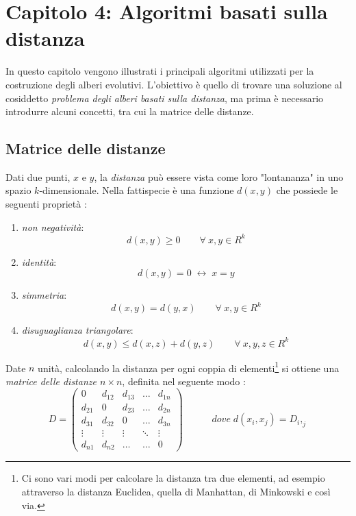 \chapter{Capitolo 4: Algoritmi basati sulla distanza}
In questo capitolo vengono illustrati i principali algoritmi utilizzati per la costruzione degli alberi evolutivi. L'obiettivo è quello di trovare una soluzione al cosiddetto \textit{problema degli alberi basati sulla distanza}, ma prima è necessario introdurre alcuni concetti, tra cui la matrice delle distanze.

\section{Matrice delle distanze}
Dati due punti, $x$ e $y$, la \textit{distanza} può essere vista come loro "lontananza" in uno spazio $k$-dimensionale. Nella fattispecie è una funzione $d(x,y)$ che possiede le seguenti proprietà \cite{dataMiningInBioinformatics}:
\begin{enumerate}
	\item \textit{non negatività}:
	\[d(x,y)\geq 0\hspace{2em} \forall \: x,y\in R^k\]
	\item \textit{identità}:
	\[d(x,y)=0 \; \leftrightarrow \; x=y\]
	\item \textit{simmetria}:
	\[d(x,y)=d(y,x)\hspace{2em} \forall \: x,y\in R^k\]
	\item \textit{disuguaglianza triangolare}:
	\[d(x,y)\leq d(x,z)+d(y,z)\hspace{2em} \forall \: x,y,z\in R^k\]
\end{enumerate}
Date $n$ unità, calcolando la distanza per ogni coppia di elementi\footnote{Ci sono vari modi per calcolare la distanza tra due elementi, ad esempio attraverso la distanza Euclidea, quella di Manhattan, di Minkowski e così via.} si ottiene una \textit{matrice delle distanze $n \times n$}, definita nel seguente modo \cite{introductionbioinfalg}:
\[
D = \begin{pmatrix}
0 & d_{12} & d_{13} & \ldots & d_{1n} \\ 
d_{21} & 0 & d_{23} & \ldots & d_{2n} \\ 
d_{31} & d_{32} & 0 & \ldots & d_{3n} \\ 
\vdots & \vdots & \vdots & \ddots & \vdots \\ 
d_{n1} & d_{n2} & \ldots & \ldots & 0
\end{pmatrix}
\hspace{3em}dove\;d(x_i,x_j)=D_i,_j
\]
